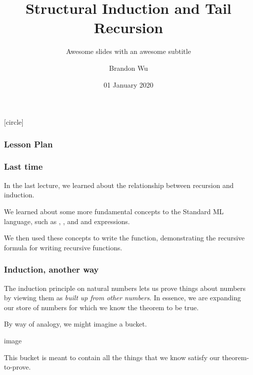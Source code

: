 \documentclass[aspectratio=169]{beamer}
\title{Structural Induction and Tail Recursion} %
\subtitle{Awesome slides with an awesome subtitle} %
\date{01 January 2020} %
\author{Brandon Wu} %
\newif\ifcolorlambda
\begin{document}
\ifweb
\renewcommand{\pause}{}
\fi

[circle]

{
\begin{frame}[plain]
\colorlambdatrue
\titlepage
\end{frame}
}

\begin{frame}[fragile]
\frametitle{Lesson Plan}

\tableofcontents
\end{frame}

\begin{frame}[fragile]
  \frametitle{Last time}

  In the last lecture, we learned about the relationship between recursion 
  and induction. 

  \vspace{\fill}
  
  We learned about some more fundamental concepts to the Standard ML language, such
  as , , and  and  expressions. 
  
  \vspace{\fill}

  We then used these concepts to write the  function, demonstrating the
  recursive formula for writing recursive functions. 
\end{frame}


\begin{frame}[fragile]
  \frametitle{Induction, another way}

  The induction principle on natural numbers lets us prove things about numbers by
  viewing them as \textit{built up from other numbers}. In essence, we are expanding our
  store of numbers for which we know the theorem to be true.

  \vspace{\fill}

  By way of analogy, we might imagine a bucket.

  \vspace{\fill}

  image

  \vspace{\fill}

  This bucket is meant to contain all the things that we know satisfy our theorem-to-prove.
\end{frame}
\end{document}
